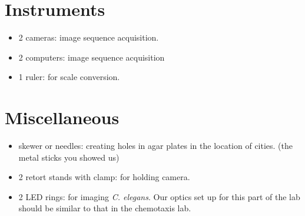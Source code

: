 \documentclass[11pt]{article}
\begin{document}
\section{Instruments}

\begin{itemize}

	\item 2 cameras: image sequence acquisition. 

	\item 2 computers: image sequence acquisition
	
	\item 1 ruler: for scale conversion.
	
\end{itemize}


\section{Miscellaneous}

\begin{itemize}
		
	\item skewer or needles: creating holes in agar plates in the location of cities. (the metal sticks you showed us)
		
	\item 2 retort stands with clamp: for holding camera.
	
	\item 2 LED rings: for imaging \emph{C. elegans}. Our optics set up for this part of the lab should be similar to that in the chemotaxis lab.
		
\end{itemize}



\end{document}
